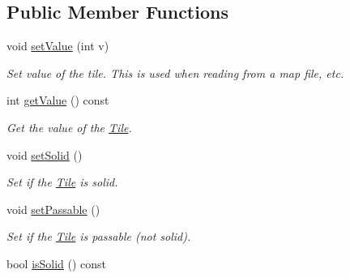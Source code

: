 \subsection*{Public Member Functions}
\begin{DoxyCompactItemize}
\item 
void \hyperlink{classTile_ae3d9e4ace265389dd0e0cf3d62ad6ff3}{set\+Value} (int v)\hypertarget{classTile_ae3d9e4ace265389dd0e0cf3d62ad6ff3}{}\label{classTile_ae3d9e4ace265389dd0e0cf3d62ad6ff3}

\begin{DoxyCompactList}\small\item\em Set value of the tile. This is used when reading from a map file, etc. \end{DoxyCompactList}\item 
int \hyperlink{classTile_aa426a6476fcf257bd0f79da4c3ed06aa}{get\+Value} () const \hypertarget{classTile_aa426a6476fcf257bd0f79da4c3ed06aa}{}\label{classTile_aa426a6476fcf257bd0f79da4c3ed06aa}

\begin{DoxyCompactList}\small\item\em Get the value of the \hyperlink{classTile}{Tile}. \end{DoxyCompactList}\item 
void \hyperlink{classTile_a3deac8e6d0ebd7b8352248201d264c38}{set\+Solid} ()\hypertarget{classTile_a3deac8e6d0ebd7b8352248201d264c38}{}\label{classTile_a3deac8e6d0ebd7b8352248201d264c38}

\begin{DoxyCompactList}\small\item\em Set if the \hyperlink{classTile}{Tile} is solid. \end{DoxyCompactList}\item 
void \hyperlink{classTile_a067099478c20b3f2fb56bc1c042a1e4e}{set\+Passable} ()\hypertarget{classTile_a067099478c20b3f2fb56bc1c042a1e4e}{}\label{classTile_a067099478c20b3f2fb56bc1c042a1e4e}

\begin{DoxyCompactList}\small\item\em Set if the \hyperlink{classTile}{Tile} is passable (not solid). \end{DoxyCompactList}\item 
bool \hyperlink{classTile_a8e67a56637124f73f3da572178dd4838}{is\+Solid} () const \hypertarget{classTile_a8e67a56637124f73f3da572178dd4838}{}\label{classTile_a8e67a56637124f73f3da572178dd4838}


\end{DoxyCompactItemize}
